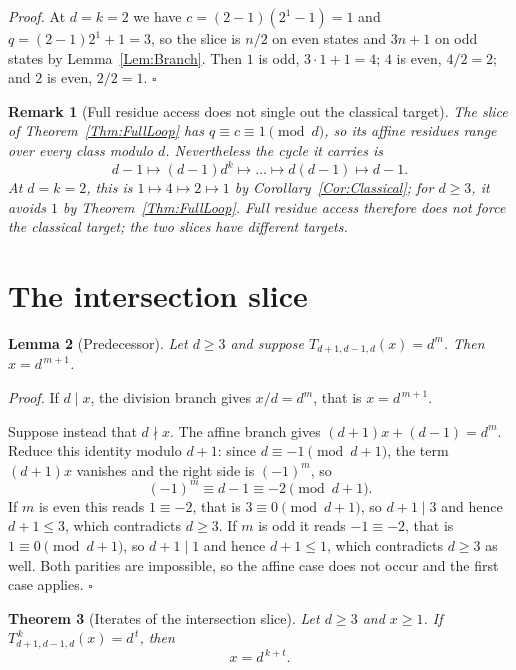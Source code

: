 \documentclass[11pt,letterpaper]{article}
\newtheorem{theorem}{Theorem}
\newtheorem{lemma}[theorem]{Lemma}
\newtheorem{remark}[theorem]{Remark}
\newenvironment{proof}{\noindent\textit{Proof.}}{\hfill\(\square\)}
\begin{document}
\begin{proof}
At \(d=k=2\) we have \(c=(2-1)(2^{1}-1)=1\) and \(q=(2-1)2^{1}+1=3\), so the
slice is \(n/2\) on even states and \(3n+1\) on odd states by
Lemma~\ref{Lem:Branch}. Then \(1\) is odd, \(3\cdot1+1=4\);
\(4\) is even, \(4/2=2\); and \(2\) is even, \(2/2=1\).
\end{proof}

\begin{remark}[Full residue access does not single out the classical target]
\label{Rem:NotClassicalOnly}
The slice of Theorem~\ref{Thm:FullLoop} has \(q\equiv c\equiv1\pmod d\), so
its affine residues range over every class modulo \(d\). Nevertheless the
cycle it carries is
\[
 d-1\mapsto(d-1)d^{k}\mapsto\dots\mapsto d(d-1)\mapsto d-1.
\]
At \(d=k=2\), this is \(1\mapsto4\mapsto2\mapsto1\) by
Corollary~\ref{Cor:Classical}; for \(d\ge3\), it avoids \(1\) by
Theorem~\ref{Thm:FullLoop}. Full residue access therefore does not force the
classical target; the two slices have different targets.
\end{remark}

\section{The intersection slice}

\begin{lemma}[Predecessor]\label{Lem:IntersectionPred}
Let \(d\ge3\) and suppose \(T_{d+1,d-1,d}(x)=d^{m}\). Then \(x=d^{\,m+1}\).
\end{lemma}

\begin{proof}
If \(d\mid x\), the division branch gives \(x/d=d^{m}\), that is
\(x=d^{\,m+1}\).

Suppose instead that \(d\nmid x\). The affine branch gives
\((d+1)x+(d-1)=d^{m}\). Reduce this identity modulo \(d+1\): since
\(d\equiv-1\pmod{d+1}\), the term \((d+1)x\) vanishes and the right side is
\((-1)^{m}\), so
\[
 (-1)^{m}\equiv d-1\equiv-2\pmod{d+1} .
\]
If \(m\) is even this reads \(1\equiv-2\), that is \(3\equiv0\pmod{d+1}\),
so \(d+1\mid3\) and hence \(d+1\le3\), which contradicts \(d\ge3\). If
\(m\) is odd it reads \(-1\equiv-2\), that is \(1\equiv0\pmod{d+1}\), so
\(d+1\mid1\) and hence \(d+1\le1\), which contradicts \(d\ge3\) as well.
Both parities are impossible, so the affine case does not occur and the first
case applies.
\end{proof}

\begin{theorem}[Iterates of the intersection slice]\label{Thm:IntersectionIterate}
Let \(d\ge3\) and \(x\ge1\). If \(T_{d+1,d-1,d}^{\,k}(x)=d^{\,t}\), then
\[
 x=d^{\,k+t} .
\]
\end{theorem}
\end{document}
